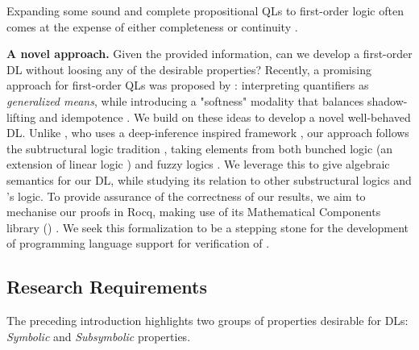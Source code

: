 Expanding some sound and complete propositional QLs to first-order logic often comes at the expense of either completeness or continuity \citep{cintula2011handbook, slusarz2023logic}.  

\textbf{A novel approach.} Given the provided information, can we develop a first-order DL without loosing any of the desirable properties?   Recently, a promising approach for first-order QLs was proposed by \citeauthor{capucci2024quantifiers}: interpreting quantifiers as \textit{generalized means}, while introducing a "softness" modality that balances shadow-lifting and idempotence \citep{capucci2024quantifiers}. We build on these ideas to develop a novel well-behaved DL. Unlike \citeauthor{capucci2024quantifiers}, who uses a deep-inference inspired framework \citep{guglielmi2007system, guglielmi2015deep}, our approach follows the subtructural logic tradition \citep{galatos2007residuated}, taking elements from both bunched logic \citep{o1999logic} (an extension of linear logic \citep{Wadler1993, agliano2025algebraic}) and fuzzy logics \citep{cintula2011handbook, prooffuzzy}. We leverage this to give algebraic semantics for our DL, while studying its relation to other substructural logics and \citeauthor{capucci2024quantifiers}'s logic. 
To provide assurance of the correctness of our results, we aim to mechanise our proofs in Rocq, making use of its Mathematical Components library (\mathcomp{}) \cite{mathcomp}. We seek this formalization to be a stepping stone for the development of programming language support for verification of \InAI{} \citep{vehicle}. 

\subsection{Research Requirements}
The preceding introduction highlights two groups of properties desirable for DLs: \emph{Symbolic} and \emph{Subsymbolic} properties. 

